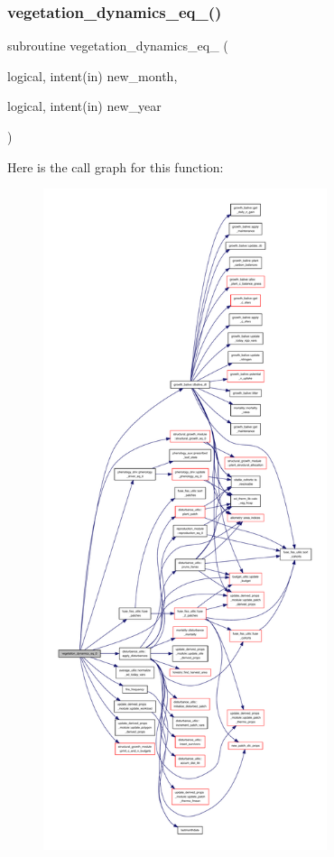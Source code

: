 \mbox{\label{vegetation__dynamics_8f90_a275be9a740f6c74b8bf5e0a499cb6c49}} 
\subsubsection{\texorpdfstring{vegetation\+\_\+dynamics\+\_\+eq\+\_()}{vegetation\_dynamics\_eq\_0()}}
{\footnotesize\ttfamily subroutine vegetation\+\_\+dynamics\+\_\+eq\+\_ (\begin{DoxyParamCaption}\item[{logical, intent(in)}]{new\+\_\+month,  }\item[{logical, intent(in)}]{new\+\_\+year }\end{DoxyParamCaption})}

Here is the call graph for this function\+:
\nopagebreak
\begin{figure}[H]
\begin{center}
\leavevmode
\includegraphics[height=550pt]{vegetation__dynamics_8f90_a275be9a740f6c74b8bf5e0a499cb6c49_cgraph}
\end{center}
\end{figure}
